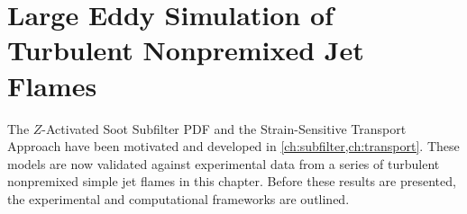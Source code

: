 \chapter{Large Eddy Simulation of Turbulent Nonpremixed Jet Flames\label{ch:lesresults}}


The $Z$-Activated Soot Subfilter PDF and the Strain-Sensitive Transport Approach have been motivated and developed in \cref{ch:subfilter,ch:transport}. These models are now validated against experimental data from a series of turbulent nonpremixed simple jet flames in this chapter. Before these results are presented, the experimental and computational frameworks are outlined. 







